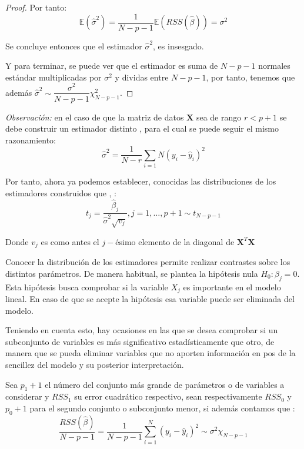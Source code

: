 \begin{propo}
\begin{proof}
\noindent Por tanto:
\begin{equation}
\mathbb{E}(\hat{\sigma}^2)= \dfrac{1}{N-p-1}\mathbb{E}(RSS(\hat{\beta}))=\sigma^2
\end{equation}

\noindent Se concluye entonces que el estimador $\hat{\sigma}^2$, es insesgado. 

\noindent Y para terminar, se puede ver que el estimador es suma de $N-p-1$ normales estándar multiplicadas por $\sigma^2$ y dividas entre $N-p-1$, por tanto, tenemos que además $\hat{\sigma}^2\sim \dfrac{\sigma^2}{N-p-1}\chi^2_{N-p-1}$.
\end{proof}
\end{propo}

\noindent \emph{Observación: } en el caso de que la matriz de datos $\mathbf{X}$ sea de rango $r<p+1$ se debe construir un estimador distinto , para el cual se puede seguir el mismo razonamiento:
\begin{equation}
\hat{\sigma}^2=\dfrac{1}{N-r}\sum_{i=1}{N}(y_i-\hat{y}_i)^2
\end{equation}

\noindent Por tanto, ahora ya podemos establecer, conocidas las distribuciones de los estimadores construidos que \cite{Greene 2008}, \cite{Hastie 2001}:
\begin{equation}
t_j=\dfrac{\hat{\beta}_j}{\hat{\sigma}^2\sqrt{v_j}}, j=1,\ldots ,p+1 \sim t_{N-p-1}
\end{equation}

\noindent Donde $v_j$ es como antes el $j-$ésimo elemento de la diagonal de $\mathbf{X}^T \mathbf{X}$

\noindent Conocer la distribución de los estimadores permite realizar contrastes sobre los distintos parámetros. De manera habitual, se plantea la hipótesis nula $H_0: \beta_j=0 $. Esta hipótesis busca comprobar si la variable $X_j$ es importante en el modelo lineal. En caso de que se acepte la hipótesis esa variable puede ser eliminada del modelo. 


\noindent Teniendo en cuenta esto,  hay ocasiones en las que se desea comprobar si un subconjunto de variables es más significativo estadísticamente que otro, de manera que se pueda eliminar variables que no aporten información en pos de la sencillez del modelo y su posterior interpretación. 

\noindent Sea $p_1+1$ el número del conjunto más grande de parámetros o de variables a considerar y $RSS_1$ su error cuadrático respectivo, sean respectivamente $RSS_0$ y $p_0+1$ para el segundo conjunto o subconjunto menor, si además contamos que :
\begin{equation}
\frac{RSS(\hat{\beta})}{N-p-1}=\frac{1}{N-p-1}\sum_{i=1}^N(y_i-\hat{y}_i)^2\sim \sigma^2 \chi_{N-p-1}
\end{equation}

